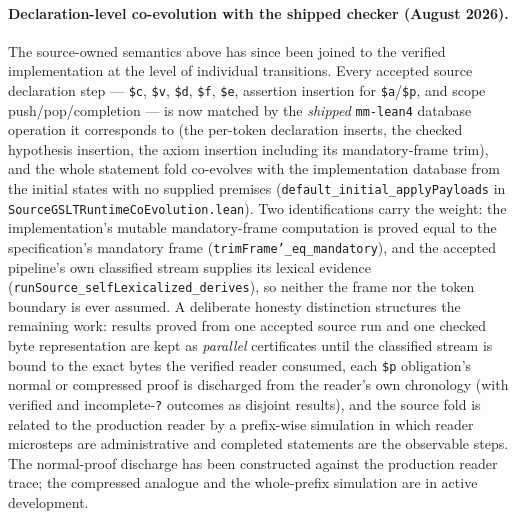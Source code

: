\documentclass[11pt]{article}
\newcommand{\code}[1]{\texttt{#1}}
\begin{document}
\paragraph{Declaration-level co-evolution with the shipped checker
(August 2026).}  The source-owned semantics above has since been joined to
the verified implementation at the level of individual transitions.  Every
accepted source declaration step --- \code{\$c}, \code{\$v}, \code{\$d},
\code{\$f}, \code{\$e}, assertion insertion for \code{\$a}/\code{\$p}, and
scope push/pop/completion --- is now matched by the \emph{shipped}
\code{mm-lean4} database operation it corresponds to (the per-token
declaration inserts, the checked hypothesis insertion, the axiom insertion
including its mandatory-frame trim), and the whole statement fold co-evolves
with the implementation database from the initial states with no supplied
premises (\code{default\_initial\_applyPayloads} in
\code{SourceGSLTRuntimeCoEvolution.lean}).  Two identifications carry the
weight: the implementation's mutable mandatory-frame computation is proved
equal to the specification's mandatory frame
(\code{trimFrame'\_eq\_mandatory}), and the accepted pipeline's own
classified stream supplies its lexical evidence
(\code{runSource\_selfLexicalized\_derives}), so neither the frame nor the
token boundary is ever assumed.  A deliberate honesty distinction
structures the remaining work: results proved from one accepted source run
and one checked byte representation are kept as \emph{parallel} certificates
until the classified stream is bound to the exact bytes the verified reader
consumed, each \code{\$p} obligation's normal or compressed proof is
discharged from the reader's own chronology (with verified and
incomplete-\code{?} outcomes as disjoint results), and the source fold is
related to the production reader by a prefix-wise simulation in which
reader microsteps are administrative and completed statements are the
observable steps.  The normal-proof discharge has been constructed against
the production reader trace; the compressed analogue and the whole-prefix
simulation are in active development.
\end{document}
